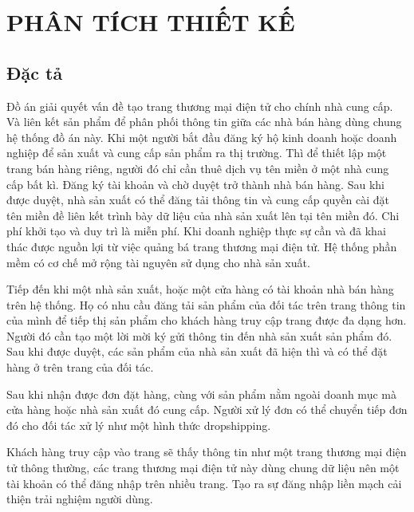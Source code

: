 \fontsize{13px}{13px}\selectfont\justifying

\chapter{PHÂN TÍCH THIẾT KẾ}

\section{Đặc tả}
Đồ án giải quyết vấn đề tạo trang thương mại điện tử cho chính nhà cung cấp. Và liên kết sản phẩm để phân phối thông tin giữa các nhà bán hàng dùng chung hệ thống đồ án này. Khi một người bắt đầu đăng ký hộ kinh doanh hoặc doanh nghiệp để sản xuất và cung cấp sản phẩm ra thị trường. Thì để thiết lập một trang bán hàng riêng, người đó chỉ cần thuê dịch vụ tên miền ở một nhà cung cấp bất kì. Đăng ký tài khoản và chờ duyệt trở thành nhà bán hàng. Sau khi được duyệt, nhà sản xuất có thể đăng tải thông tin và cung cấp quyền cài đặt tên miền đề liên kết trình bày dữ liệu của nhà sản xuất lên tại tên miền đó. Chi phí khởi tạo và duy trì là miễn phí. Khi doanh nghiệp thực sự cần và đã khai thác được nguồn lợi từ việc quảng bá trang thương mại điện tử. Hệ thống phần mềm có cơ chế mở rộng tài nguyên sử dụng cho nhà sản xuất.

Tiếp đến khi một nhà sản xuất, hoặc một cửa hàng có tài khoản nhà bán hàng trên hệ thống. Họ có nhu cầu đăng tải sản phẩm của đối tác trên trang thông tin của mình để tiếp thị sản phẩm cho khách hàng truy cập trang được đa dạng hơn. Người đó cần tạo một lời mời ký gửi thông tin đến nhà sản xuất sản phẩm đó. Sau khi được duyệt, các sản phẩm của nhà sản xuất đã hiện thì và có thể đặt hàng ở trên trang của đối tác.

Sau khi nhận được đơn đặt hàng, cùng với sản phẩm nằm ngoài doanh mục mà cửa hàng hoặc nhà sản xuất đó cung cấp. Người xử lý đơn có thể chuyển tiếp đơn đó cho đối tác xử lý như một hình thức \gls{dropshipping}.

Khách hàng truy cập vào trang sẽ thấy thông tin như một trang thương mại điện tử thông thường, các trang thương mại điện tử này dùng chung dữ liệu nên một tài khoản có thể đăng nhập trên nhiều trang. Tạo ra sự đăng nhập liền mạch cải thiện trải nghiệm người dùng.

